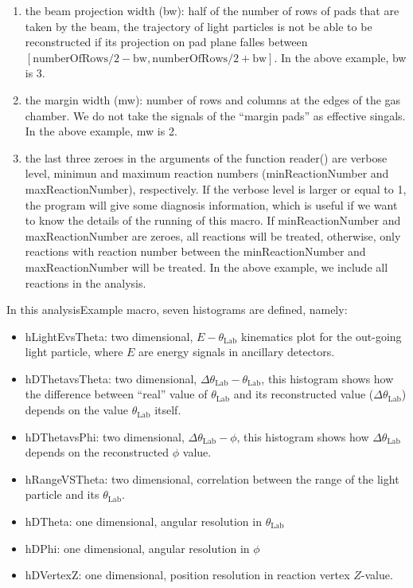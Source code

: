 \begin{enumerate}
 \item the beam projection width (bw): half of the number of rows of pads that are taken by the beam, the trajectory of light particles is not be able to be reconstructed if its projection on pad plane falles between $[\text{numberOfRows}/2-\text{bw}, \text{numberOfRows}/2+\text{bw}]$. In the above example, bw is 3.

\item the margin width (mw): number of rows and columns at the edges of the gas chamber. We do not take the signals of the ``margin pads'' as effective singals. In the above example, mw is 2.

\item the last three zeroes in the arguments of the function reader() are verbose level, minimun and maximum reaction numbers (minReactionNumber and maxReactionNumber), respectively. If the verbose level is larger or equal to 1, the program will give some diagnosis information, which is useful if we want to know the details of the running of this macro. If minReactionNumber and maxReactionNumber are zeroes, all reactions will be treated, otherwise, only reactions with reaction number between the minReactionNumber and maxReactionNumber will be treated. In the above example, we include all reactions in the analysis.
\end{enumerate}

In this analysisExample macro, seven histograms are defined, namely:
\begin{itemize}
\item hLightEvsTheta: two dimensional, $E-\theta_\text{Lab}$ kinematics plot for the out-going light particle, where $E$ are energy signals in ancillary detectors.

\item hDThetavsTheta: two dimensional, $\Delta\theta_\text{Lab}-\theta_\text{Lab}$, this histogram shows how the difference between ``real'' value of $\theta_\text{Lab}$ and its reconstructed value ($\Delta\theta_\text{Lab}$) depends on the value $\theta_\text{Lab}$ itself.

\item hDThetavsPhi: two dimensional, $\Delta\theta_\text{Lab}-\phi$, this histogram shows how $\Delta\theta_\text{Lab}$ depends on the reconstructed $\phi$ value.

\item hRangeVSTheta: two dimensional, correlation between the range of the light particle and its $\theta_\text{Lab}$.

\item hDTheta: one dimensional, angular resolution in $\theta_\text{Lab}$

\item hDPhi: one dimensional, angular resolution in $\phi$

\item hDVertexZ: one dimensional, position resolution in reaction vertex $Z$-value.
\end{itemize}

